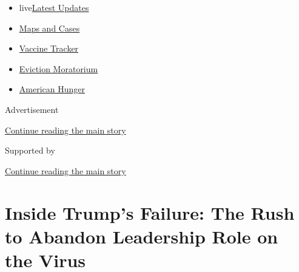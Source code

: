 \begin{itemize}
\tightlist
\item
  live\href{https://www.nytimes3xbfgragh.onion/2020/09/08/world/covid-19-coronavirus.html?name=styln-coronavirus-national\&region=TOP_BANNER\&block=storyline_menu_recirc\&action=click\&pgtype=Article\&impression_id=9509a2b1-f27a-11ea-846f-7542dfffcf40\&variant=undefined}{Latest
  Updates}
\item
  \href{https://www.nytimes3xbfgragh.onion/interactive/2020/us/coronavirus-us-cases.html?name=styln-coronavirus-national\&region=TOP_BANNER\&block=storyline_menu_recirc\&action=click\&pgtype=Article\&impression_id=9509c9c0-f27a-11ea-846f-7542dfffcf40\&variant=undefined}{Maps
  and Cases}
\item
  \href{https://www.nytimes3xbfgragh.onion/interactive/2020/science/coronavirus-vaccine-tracker.html?name=styln-coronavirus-national\&region=TOP_BANNER\&block=storyline_menu_recirc\&action=click\&pgtype=Article\&impression_id=9509c9c1-f27a-11ea-846f-7542dfffcf40\&variant=undefined}{Vaccine
  Tracker}
\item
  \href{https://www.nytimes3xbfgragh.onion/2020/09/02/your-money/eviction-moratorium-covid.html?name=styln-coronavirus-national\&region=TOP_BANNER\&block=storyline_menu_recirc\&action=click\&pgtype=Article\&impression_id=9509c9c2-f27a-11ea-846f-7542dfffcf40\&variant=undefined}{Eviction
  Moratorium}
\item
  \href{https://www.nytimes3xbfgragh.onion/interactive/2020/09/02/magazine/food-insecurity-hunger-us.html?name=styln-coronavirus-national\&region=TOP_BANNER\&block=storyline_menu_recirc\&action=click\&pgtype=Article\&impression_id=9509c9c3-f27a-11ea-846f-7542dfffcf40\&variant=undefined}{American
  Hunger}
\end{itemize}

Advertisement

\protect\hyperlink{after-top}{Continue reading the main story}

Supported by

\protect\hyperlink{after-sponsor}{Continue reading the main story}

\hypertarget{inside-trumps-failure-the-rush-to-abandon-leadership-role-on-the-virus}{%
\section{Inside Trump's Failure: The Rush to Abandon Leadership Role on
the
Virus}\label{inside-trumps-failure-the-rush-to-abandon-leadership-role-on-the-virus}}

